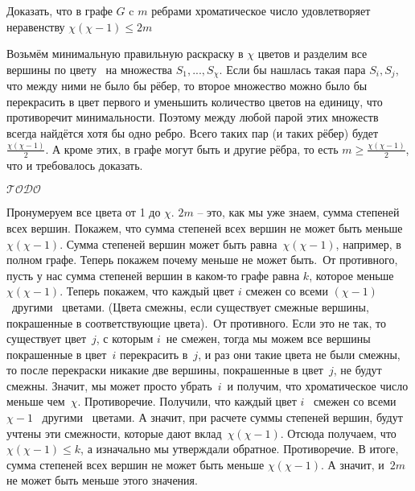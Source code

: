 \documentclass[a4paper,12pt]{article}
\numberwithin{figure}{section}
\def\TODO{\guillemotleft$\mathcal{TODO}$\guillemotright\textellipsis}
\begin{document}
\begin{problem}
	Доказать, что в графе $G$ c $m$ ребрами хроматическое число удовлетворяет неравенству $\chi(\chi-1) \leqslant 2m$
\end{problem}

\begin{solution}
	Возьмём минимальную правильную раскраску в $\chi$ цветов и разделим все вершины по цвету  на множества $S_1,...,S_{\chi}$. Если бы нашлась такая пара $S_i,S_j$, что между ними не было бы рёбер, то второе множество можно было бы перекрасить в цвет первого и уменьшить количество цветов на единицу, что противоречит минимальности. Поэтому между любой парой этих множеств всегда найдётся хотя бы одно ребро. Всего таких пар (и таких рёбер) будет $\displaystyle\frac{\chi(\chi-1)}{2}$. А кроме этих, в графе могут быть и другие рёбра, то есть $\displaystyle m \geqslant \frac{\chi(\chi-1)}2$, что и требовалось доказать.
\end{solution}

\begin{solution}
	\TODO
	
	Пронумеруем все цвета от 1 до $\chi$. $2m$ -- это, как мы уже знаем, сумма степеней всех вершин. Покажем, что сумма степеней всех вершин не может быть меньше $\chi(\chi-1)$.
	Сумма степеней вершин может быть равна $\chi(\chi-1)$, например, в полном графе. Теперь покажем почему меньше не может быть. От противного, пусть у нас сумма степеней вершин в каком-то графе равна $k$, которое меньше $\chi(\chi-1)$.
	Теперь покажем, что каждый цвет $i$ смежен со всеми $(\chi-1)$ другими  цветами. (Цвета смежны, если существует смежные вершины, покрашенные в соответствующие цвета). От противного. Если это не так, то существует цвет $j$, с которым $i$ не смежен, тогда мы можем все вершины покрашенные в цвет $i$ перекрасить в $j$, и раз они такие цвета не были смежны, то после перекраски никакие две вершины, покрашенные в цвет $j$, не будут смежны. Значит, мы может просто убрать $i$ и получим, что хроматическое число меньше чем $\chi$. Противоречие.
	Получили, что каждый цвет $i$  смежен со всеми $\chi-1$  другими  цветами. А значит, при расчете суммы степеней вершин, будут учтены эти смежности, которые дают вклад $\chi(\chi-1)$. Отсюда получаем, что $\chi(\chi-1) \leqslant k$, а изначально мы утверждали обратное. Противоречие.
	В итоге, сумма степеней всех вершин не может быть меньше $\chi(\chi-1)$. А значит, и $2m$ не может быть меньше этого значения. 
\end{solution}
\end{document}
